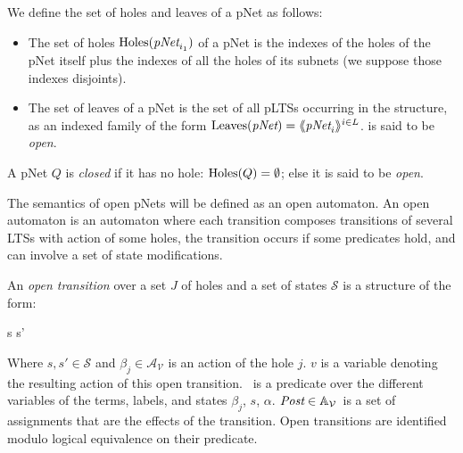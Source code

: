 \documentclass[runningheads,a4paper]{llncs}
\newcommand{\cA}{\ensuremath{\mathcal{A}}}
\newcommand{\sA}{\ensuremath{\mathbb{A}}}
\newcommand{\cV}{\ensuremath{\mathcal{V}}}
\newcommand{\variables}{\ensuremath{\cV}}
\newcommand{\actions}[1]{\ensuremath{\cA_{#1}}}
\newcommand{\assigns}[1]{\ensuremath{\sA_{#1}}}
\begin{document}
\begin{definition}[pNets]
\begin{itemize}
\end{itemize}
We define the set of holes and leaves of a pNet as follows:
  \begin{itemize}
\item
The set of holes $\Holes(\pNet_{i_1})$ of a pNet is the indexes of the holes of the pNet 
itself plus the indexes of all the holes of its subnets (we suppose those indexes 
disjoints).
%
\item
The set of leaves of a pNet is the set of all pLTSs occurring in the structure, as an 
indexed family of the form $\Leaves(\pNet)= \mylangle \pNet_i \myrangle^{i \in L}$.
is said to be \emph{open}.
\end{itemize}
A pNet $Q$ is \emph{closed} if it has no hole: $\operatorname{Holes}(Q)=\emptyset$; else it
is said to be \emph{open}.
\end{definition}



The semantics of open pNets will be defined  as an open automaton. An open
automaton is an automaton where each transition composes transitions of several LTSs with action of some holes, the transition occurs if some predicates hold, and can involve a set of state modifications.

\begin{definition}
	\label{def:OpenTransitions}
	An \emph{open transition} over a
	set $J$ of holes  and a set of states $\mathcal{S}$ is 
	a structure of the form:	
	\begin{mathpar}
	{s \OTarrow {{\alpha}}s'}
	\end{mathpar}
	Where $s, s'\in\mathcal{S}$ and $\beta_j\in\actions{\variables}$
        is an action of the hole $j$. $v$ is a variable denoting the resulting action
        of this open transition. \Pred\ is a predicate 
	over the different variables of the
	terms, labels, and states  $\beta_j$, $s$, $\alpha$. $\Post\in 
	\assigns{\variables}$\ is 
	a set of assignments that are the effects of the transition.
Open transitions are identified modulo logical equivalence on their predicate.
\end{definition}
\end{document}
